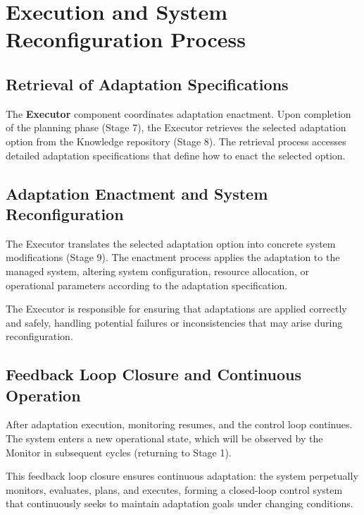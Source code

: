 \documentclass[11pt,a4paper]{article}
\begin{document}

\section{Execution and System Reconfiguration Process}
\label{sec:execution}

\subsection{Retrieval of Adaptation Specifications}
\label{subsec:retrieval}

The \textbf{Executor} component coordinates adaptation enactment. Upon completion of the planning phase (Stage 7), the Executor retrieves the selected adaptation option from the Knowledge repository (Stage 8). The retrieval process accesses detailed adaptation specifications that define how to enact the selected option.

\subsection{Adaptation Enactment and System Reconfiguration}
\label{subsec:enactment}

The Executor translates the selected adaptation option into concrete system modifications (Stage 9). The enactment process applies the adaptation to the managed system, altering system configuration, resource allocation, or operational parameters according to the adaptation specification.

The Executor is responsible for ensuring that adaptations are applied correctly and safely, handling potential failures or inconsistencies that may arise during reconfiguration.

\subsection{Feedback Loop Closure and Continuous Operation}
\label{subsec:loop-closure}

After adaptation execution, monitoring resumes, and the control loop continues. The system enters a new operational state, which will be observed by the Monitor in subsequent cycles (returning to Stage 1).

This feedback loop closure ensures continuous adaptation: the system perpetually monitors, evaluates, plans, and executes, forming a closed-loop control system that continuously seeks to maintain adaptation goals under changing conditions.
\end{document}
